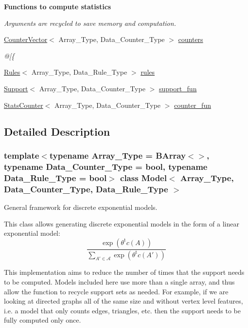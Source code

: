 \begin{Indent}\textbf{ Functions to compute statistics}\par
{\em Arguments are recycled to save memory and computation. }\begin{DoxyCompactItemize}
\item 
\hyperlink{class_counter_vector}{Counter\+Vector}$<$ Array\+\_\+\+Type, Data\+\_\+\+Counter\+\_\+\+Type $>$ \hyperlink{class_model_aeabec424c8fa4f412a74ec6fd4622bac}{counters}
\begin{DoxyCompactList}\small\item\em @\mbox{[}\{ \end{DoxyCompactList}\item 
\hyperlink{class_rules}{Rules}$<$ Array\+\_\+\+Type, Data\+\_\+\+Rule\+\_\+\+Type $>$ \hyperlink{class_model_a65b96a73f8dba8a00cc767753aaca22b}{rules}
\item 
\hyperlink{class_support}{Support}$<$ Array\+\_\+\+Type, Data\+\_\+\+Counter\+\_\+\+Type $>$ \hyperlink{class_model_acf989d2fcbbb83cca1c76d4c95cf3104}{support\+\_\+fun}
\item 
\hyperlink{class_stats_counter}{Stats\+Counter}$<$ Array\+\_\+\+Type, Data\+\_\+\+Counter\+\_\+\+Type $>$ \hyperlink{class_model_a2bb5ec8af1a49bcb2da6c5f9f2374b15}{counter\+\_\+fun}
\end{DoxyCompactItemize}
\end{Indent}


\subsection{Detailed Description}
\subsubsection*{template$<$typename Array\+\_\+\+Type = B\+Array$<$$>$, typename Data\+\_\+\+Counter\+\_\+\+Type = bool, typename Data\+\_\+\+Rule\+\_\+\+Type = bool$>$\newline
class Model$<$ Array\+\_\+\+Type, Data\+\_\+\+Counter\+\_\+\+Type, Data\+\_\+\+Rule\+\_\+\+Type $>$}

General framework for discrete exponential models. 

This class allows generating discrete exponential models in the form of a linear exponential model\+: \[ \frac{ \exp{\left(\theta^{\mbox{t}}c(A)\right)} }{ \sum_{A'\in \mathcal{A}}\exp{\left(\theta^{\mbox{t}}c(A')\right)} } \]

This implementation aims to reduce the number of times that the support needs to be computed. Models included here use more than a single array, and thus allow the function to recycle support sets as needed. For example, if we are looking at directed graphs all of the same size and without vertex level features, i.\+e. a model that only counts edges, triangles, etc. then the support needs to be fully computed only once. 

